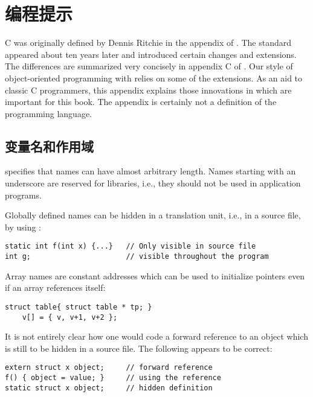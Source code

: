 

\chapter{ 编程提示}
\label{apd:CProgrammingHints}
C was originally defined by Dennis Ritchie in the appendix of \cite{KR78}.
The  standard \cite{ANSI} appeared about ten years later and
introduced certain changes and extensions. The differences are summarized
very concisely in appendix C of \cite{KR88}. Our style of object-oriented
programming with  relies on some of the extensions. As an aid
to classic C programmers, this appendix explains those innovations in
 which are important for this book. The appendix is certainly
not a definition of the  programming language.

\section{变量名和作用域}
 specifies that names can have almost arbitrary length. Names
starting with an underscore are reserved for libraries, i.e., they should
not be used in application programs.

Globally defined names can be hidden in a translation unit, i.e., in a
source file, by using :
\begin{lstlisting}
static int f(int x) {...}	// Only visible in source file
int g;						// visible throughout the program
\end{lstlisting}
Array names are constant addresses which can be used to initialize pointers
even if an array references itself:
\begin{lstlisting}
struct table{ struct table * tp; }
	v[] = { v, v+1, v+2 };
\end{lstlisting}
It is not entirely clear how one would code a forward reference to an object
which is still to be hidden in a source file. The following appears to be
correct:
\begin{lstlisting}
extern struct x object;		// forward reference
f() { object = value; }		// using the reference
static struct x object;		// hidden definition
\end{lstlisting}

